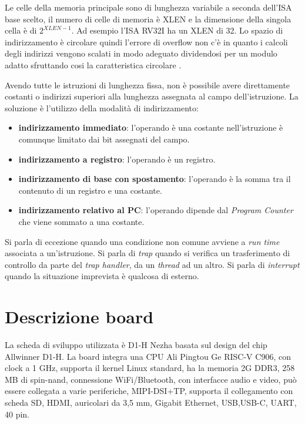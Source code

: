 \documentclass[12pt, a4paper]{report}
\begin{document}
Le celle della memoria principale sono di lunghezza variabile a seconda dell'ISA base scelto, il numero di celle di memoria è XLEN e la dimensione della singola cella è di $2^{XLEN - 1}$. Ad esempio l'ISA RV32I ha un XLEN di 32. Lo spazio di indirizzamento è circolare quindi l'errore di overflow non c'è in quanto i calcoli degli indirizzi vengono scalati in modo adeguato dividendosi per un modulo adatto sfruttando cosi la caratteristica circolare \cite{ISA}.


Avendo tutte le istruzioni di lunghezza fissa, non è possibile avere direttamente costanti o indirizzi superiori alla lunghezza assegnata al campo dell'istruzione. La soluzione è l'utilizzo della modalità di indirizzamento:
\begin{itemize}
	\item \textbf{indirizzamento immediato}: l’operando è una costante nell’istruzione è comunque limitato dai bit assegnati del campo.
	\item \textbf{indirizzamento a registro}: l’operando è un registro.
	\item \textbf{indirizzamento di base con spostamento}: l’operando è la somma tra il
contenuto di un registro e una costante.
\item \textbf{indirizzamento relativo al PC}: l'operando dipende dal \textit{Program Counter} che viene sommato a una costante.
\end{itemize}


Si parla di eccezione quando una condizione non comune avviene a \textit{run time} associata a un'istruzione.
Si parla di \textit{trap} quando si verifica un trasferimento di controllo da parte del \textit{trap handler}, da un \textit{thread} ad un altro. Si parla di \textit{interrupt} quando la situazione imprevista è qualcosa di esterno.



\section{Descrizione board} 

La scheda di sviluppo utilizzata è D1-H Nezha basata sul design del chip Allwinner D1-H. La board integra una CPU Ali Pingtou Ge RISC-V C906, con clock a 1 GHz, supporta il kernel Linux standard, ha la memoria 2G DDR3, 258 MB di spin-nand, connessione WiFi/Bluetooth, con interfacce audio e video, può essere collegata a varie periferiche, MIPI-DSI+TP, supporta il collegamento con scheda SD, HDMI, auricolari da 3,5 mm, Gigabit Ethernet, USB,USB-C, UART, 40 pin.
\end{document}
